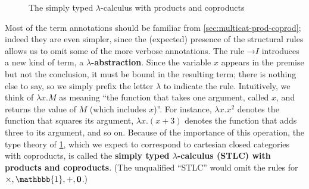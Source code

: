 \documentclass{book}
\def\idfunc{\mathsf{id}}
\let\types\vdash
\def\type{\;\ftype}
\def\unit{\mathbbb{1}}%
\def\ttt{\mathord{\ast}}%
\def\timesE{\ensuremath{\mathord{\times}E}}
\def\timesI{\ensuremath{\mathord{\times}I}}
\def\pair#1#2{\langle #1,#2\rangle}
\def\pr#1#2#3{\pi_{#1}^{#2,#3}}
\def\plusE{\mathord{+}E}
\def\plusI{\mathord{+}I}
\def\inl{\mathsf{inl}}
\def\inr{\mathsf{inr}}
\def\acase#1#2{\mathsf{match}_{#1+#2}}
\def\match{\mathsf{match}}
\def\zero{\mathbf{0}}
\def\abort{\match_{\zero}}
\def\toI{\mathord{\to}I}
\def\toE{\mathord{\to}E}
\begin{document}
\begin{figure}
  \centering
  \caption{The simply typed $\lambda$-calculus with products and coproducts}
  \label{fig:stlc}
\end{figure}

Most of the term annotations should be familiar from \cref{sec:multicat-prod-coprod}; indeed they are even simpler, since the (expected) presence of the structural rules allows us to omit some of the more verbose annotations.
The rule $\toI$ introduces a new kind of term, a \textbf{$\lambda$-abstraction}.
Since the variable $x$ appears in the premise but not the conclusion, it must be bound in the resulting term; there is nothing else to say, so we simply prefix the letter $\lambda$ to indicate the rule.
Intuitively, we think of $\lambda x.M$ as meaning ``the function that takes one argument, called $x$, and returns the value of $M$ (which includes $x$)''.
For instance, $\lambda x.x^2$ denotes the function that squares its argument, $\lambda x.(x+3)$ denotes the function that adds three to its argument, and so on.
Because of the importance of this operation, the type theory of \cref{fig:stlc}, which we expect to correspond to cartesian closed categories with coproducts, is called the \textbf{simply typed $\lambda$-calculus (STLC) with products and coproducts}.
(The unqualified ``STLC'' would omit the rules for $\times,\unit,+,\zero$.)
\end{document}
